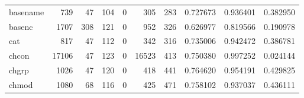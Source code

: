 \begin{tabular}{lrrrrrrrrr}
basename  &                                                739 &                                                 47 &                                                104 &                                                  0 &                                                305 &                                                283 &                                           0.727673 &                               0.936401 &                             0.382950 \\
basenc    &                                               1707 &                                                308 &                                                121 &                                                  0 &                                                952 &                                                326 &                                           0.626977 &                               0.819566 &                             0.190978 \\
cat       &                                                817 &                                                 47 &                                                112 &                                                  0 &                                                342 &                                                316 &                                           0.735006 &                               0.942472 &                             0.386781 \\
chcon     &                                              17106 &                                                 47 &                                                123 &                                                  0 &                                              16523 &                                                413 &                                           0.750380 &                               0.997252 &                             0.024144 \\
chgrp     &                                               1026 &                                                 47 &                                                120 &                                                  0 &                                                418 &                                                441 &                                           0.764620 &                               0.954191 &                             0.429825 \\
chmod     &                                               1080 &                                                 68 &                                                116 &                                                  0 &                                                425 &                                                471 &                                           0.758102 &                               0.937037 &                             0.436111 \\

\end{tabular}
